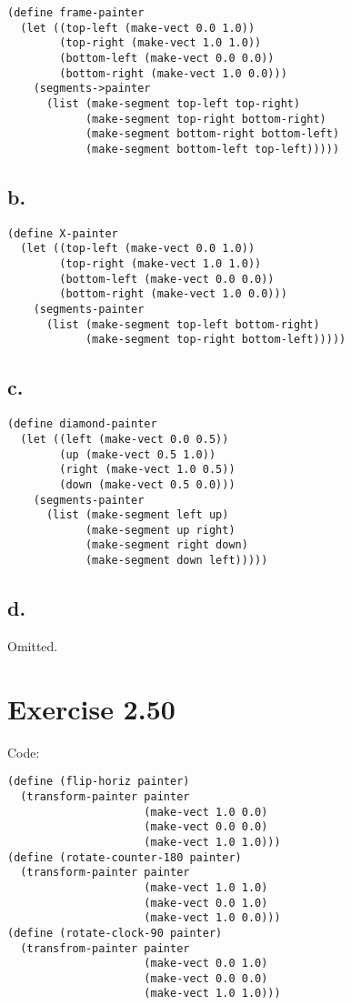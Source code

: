 \documentclass[../main.tex]{subfiles}
\begin{document}
\begin{lstlisting}
(define frame-painter
  (let ((top-left (make-vect 0.0 1.0))
        (top-right (make-vect 1.0 1.0))
        (bottom-left (make-vect 0.0 0.0))
        (bottom-right (make-vect 1.0 0.0)))
    (segments->painter
      (list (make-segment top-left top-right)
            (make-segment top-right bottom-right)
            (make-segment bottom-right bottom-left)
            (make-segment bottom-left top-left)))))
\end{lstlisting}

\subsection{b.}

\begin{lstlisting}
(define X-painter
  (let ((top-left (make-vect 0.0 1.0))
        (top-right (make-vect 1.0 1.0))
        (bottom-left (make-vect 0.0 0.0))
        (bottom-right (make-vect 1.0 0.0)))
    (segments-painter
      (list (make-segment top-left bottom-right)
            (make-segment top-right bottom-left)))))
\end{lstlisting}

\subsection{c.}

\begin{lstlisting}
(define diamond-painter
  (let ((left (make-vect 0.0 0.5))
        (up (make-vect 0.5 1.0))
        (right (make-vect 1.0 0.5))
        (down (make-vect 0.5 0.0)))
    (segments-painter
      (list (make-segment left up)
            (make-segment up right)
            (make-segment right down)
            (make-segment down left)))))
\end{lstlisting}

\subsection{d.}

Omitted.

\section{Exercise 2.50}

Code:

\begin{lstlisting}
(define (flip-horiz painter)
  (transform-painter painter
                     (make-vect 1.0 0.0)
                     (make-vect 0.0 0.0)
                     (make-vect 1.0 1.0)))
(define (rotate-counter-180 painter)
  (transform-painter painter
                     (make-vect 1.0 1.0)
                     (make-vect 0.0 1.0)
                     (make-vect 1.0 0.0)))
(define (rotate-clock-90 painter)
  (transfrom-painter painter
                     (make-vect 0.0 1.0)
                     (make-vect 0.0 0.0)
                     (make-vect 1.0 1.0)))
\end{lstlisting}
\end{document}
